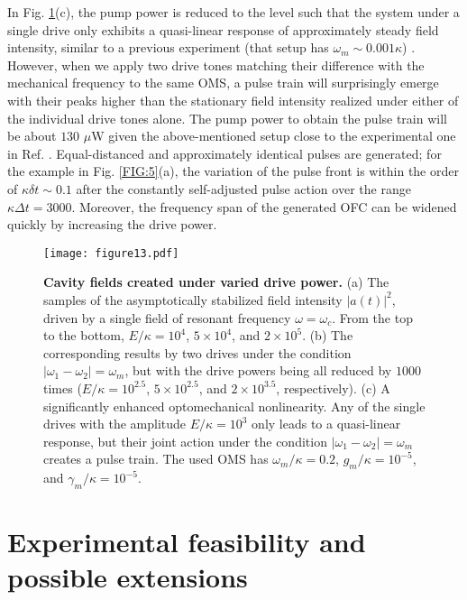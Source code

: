 \documentclass[a4paper,fleqn]{cas-dc}
\begin{document}
In Fig. \ref{FIG:13}(c), the pump power is reduced to the level such that the system under a single drive only exhibits a quasi-linear response of approximately steady field intensity, similar to a previous experiment (that setup has $\omega_m\sim 0.001\kappa$) \cite{doolin2014nonlinear}. However, when we apply two drive tones matching their difference with the mechanical frequency to the same OMS, a pulse train will surprisingly emerge with their peaks higher than the stationary field intensity realized under either of the individual drive tones alone. The pump power to obtain the pulse train will be about $130$ $\mu$W given the above-mentioned setup close to the experimental one in Ref. \cite{hu2021generation}. Equal-distanced and approximately identical pulses are generated; for the example in Fig. \ref{FIG:5}(a), the variation of the pulse front is within the order of $\kappa \delta t\sim 0.1$ after the constantly self-adjusted pulse action over the range $\kappa \Delta t=3000$. Moreover, the frequency span of the generated OFC can be widened quickly by increasing the drive power.  

\begin{figure}
	\centering
		\texttt{[image: figure13.pdf]}
	\caption{{\bf Cavity fields created under varied drive power.} 
(a) The samples of the asymptotically stabilized field intensity $|a(t)|^2$, driven by a single field of resonant frequency $\omega=\omega_c$. From the top to the bottom, $E/\kappa=10^4$, $5\times 10^4$, and $2\times 10^5$. 
(b) The corresponding results by two drives under the condition $|\omega_1-\omega_2|=\omega_m$, but with the drive powers being all reduced by $1000$ times ($E/\kappa=10^{2.5}$, $5\times 10^{2.5}$, and $2\times 10^{3.5}$, respectively). (c) A significantly enhanced optomechanical nonlinearity. 
Any of the single drives with the amplitude $E/\kappa=10^3$ only leads to a quasi-linear response, 
but their joint action under the condition $|\omega_1-\omega_2|=\omega_m$ creates a pulse train. 
The used OMS has $\omega_m/\kappa=0.2$, $g_m/\kappa=10^{-5}$, and $\gamma_m/\kappa=10^{-5}$.}
	\label{FIG:13}
\end{figure}

\section{Experimental feasibility and possible extensions}
\end{document}
